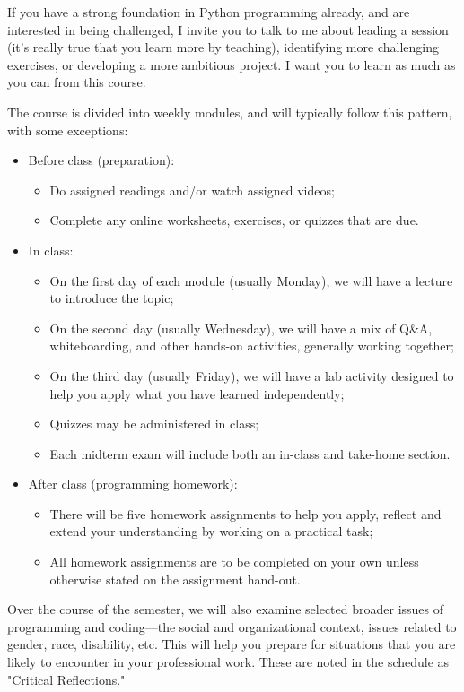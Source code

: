 \documentclass[11pt]{article}
\begin{document}
If you have a strong foundation in Python programming already, and are interested in being challenged, I invite you to talk to me about leading a session (it’s really true that you learn more by teaching), identifying more challenging exercises, or developing a more ambitious project. I want you to learn as much as you can from this course.

The course is divided into weekly modules, and will typically follow this pattern, with some exceptions:

\begin{itemize}
	\item Before class (preparation):
	\begin{itemize}
		\item Do assigned readings and/or watch assigned videos; 
		\item Complete any online worksheets, exercises, or quizzes that are due.
	\end{itemize}
	\item In class:
	\begin{itemize}
		\item On the first day of each module (usually Monday), we will have a lecture to introduce the topic;
		\item On the second day (usually Wednesday), we will have a mix of Q\&A, whiteboarding, and other hands-on activities, generally working together;
		\item On the third day (usually Friday), we will have a lab activity designed to help you apply what you have learned independently;
		\item Quizzes may be administered in class;
		\item Each midterm exam will include both an in-class and take-home section.
	\end{itemize}
	\item After class (programming homework):
	\begin{itemize}
		\item There will be five homework assignments to help you apply, reflect and extend your understanding by working on a practical task;
		\item	All homework assignments are to be completed on your own unless otherwise stated on the assignment hand-out.
	\end{itemize}
\end{itemize}

Over the course of the semester, we will also examine selected broader issues of programming and coding–--the social and organizational context, issues related to gender, race, disability, etc. This will help you prepare for situations that you are likely to encounter in your professional work. These are noted in the schedule as "Critical Reflections."
\end{document}
